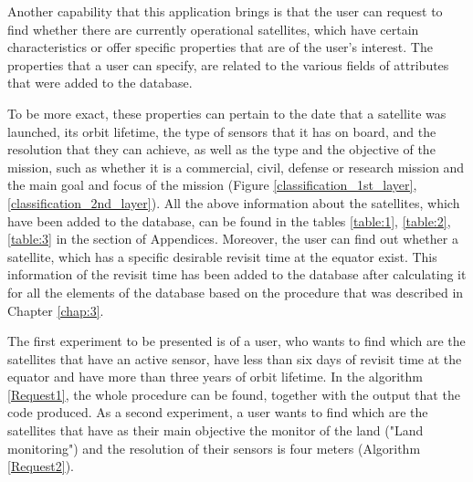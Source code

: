 Another capability that this application brings is that the user can request to find whether there are currently operational satellites, which have certain characteristics or offer specific properties that are of the user's interest. The properties that a user can specify, are related to the various fields of attributes that were added to the database.

To be more exact, these properties can pertain to the date that a satellite was launched, its orbit lifetime, the type of sensors that it has on board, and the resolution that they can achieve, as well as the type and the objective of the mission, such as whether it is a commercial, civil, defense or research mission and the main goal and focus of the mission (Figure \ref{classification_1st_layer}, \ref{classification_2nd_layer}). All the above information about the satellites, which have been added to the database, can be found in the tables \ref{table:1}, \ref{table:2}, \ref{table:3} in the section of Appendices. Moreover, the user can find out whether a satellite, which has a specific desirable revisit time at the equator exist. This information of the revisit time has been added to the database after calculating it for all the elements of the database based on the procedure that was described in Chapter \ref{chap:3}.

\bigskip

The first experiment to be presented is of a user, who wants to find which are the satellites that have an active sensor, have less than six days of revisit time at the equator and have more than three years of orbit lifetime. In the algorithm \ref{Request1}, the whole procedure can be found, together with the output that the code produced. As a second experiment, a user wants to find which are the satellites that have as their main objective the monitor of the land ("Land monitoring") and the resolution of their sensors is four meters (Algorithm \ref{Request2}).

